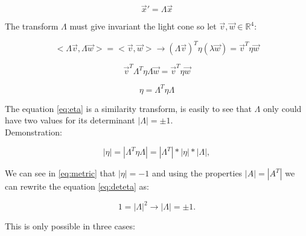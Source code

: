 \documentclass[spanish,notitlepage,letterpaper,11pt]{article} %
\begin{document}
\begin{equation}\label{eq:LT}
    \vec{x}' = \Lambda \vec{x}
\end{equation}

The transform $\Lambda$ must give invariant the light cone so let $\vec{v} , \vec{w} \in \mathbb{R}^4$:

\begin{equation*}
    <\Lambda \vec{v} , \Lambda \vec{w} > = <\vec{v} , \vec{w}> \rightarrow (\Lambda \vec{v})^T\eta(\lambda\vec{w}) = \vec{v}^T \eta \vec{w}
\end{equation*}

\begin{equation*}
    \vec{v}^T\Lambda^T\eta\Lambda\vec{w} = \vec{v}^T\eta\vec{w}
\end{equation*}

\begin{equation}\label{eq:eta}
    \eta = \Lambda ^T \eta \Lambda
\end{equation}

The equation \ref{eq:eta} is a similarity transform, is easily to see that $\Lambda$ only could have two values for its determinant $|\Lambda| = \pm 1$. \\

Demonstration:

\begin{equation}\label{eq:deteta}
    |\eta| = |\Lambda^T\eta\Lambda| = |\Lambda^T|*|\eta|*|\Lambda|,
\end{equation}

We can see in \ref{eq:metric} that $|\eta| = -1$ and using the properties $|A| = |A^T|$ we can rewrite the equation \ref{eq:deteta} as:

\begin{equation*}
    1 = |\Lambda|^2 \rightarrow |\Lambda| = \pm 1.
\end{equation*}

This is only possible in three cases:
\end{document}
